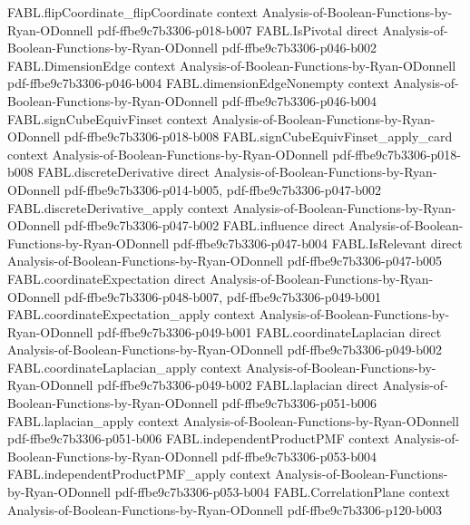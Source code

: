 \begin{theorem}
  {FABL.flipCoordinate_flipCoordinate}
  {context}
  {Analysis-of-Boolean-Functions-by-Ryan-ODonnell}
  {pdf-ffbe9c7b3306-p018-b007}
\proofstep
  {FABL.IsPivotal}
  {direct}
  {Analysis-of-Boolean-Functions-by-Ryan-ODonnell}
  {pdf-ffbe9c7b3306-p046-b002}
\proofstep
  {FABL.DimensionEdge}
  {context}
  {Analysis-of-Boolean-Functions-by-Ryan-ODonnell}
  {pdf-ffbe9c7b3306-p046-b004}
\proofstep
  {FABL.dimensionEdgeNonempty}
  {context}
  {Analysis-of-Boolean-Functions-by-Ryan-ODonnell}
  {pdf-ffbe9c7b3306-p046-b004}
\proofstep
  {FABL.signCubeEquivFinset}
  {context}
  {Analysis-of-Boolean-Functions-by-Ryan-ODonnell}
  {pdf-ffbe9c7b3306-p018-b008}
\proofstep
  {FABL.signCubeEquivFinset_apply_card}
  {context}
  {Analysis-of-Boolean-Functions-by-Ryan-ODonnell}
  {pdf-ffbe9c7b3306-p018-b008}
\proofstep
  {FABL.discreteDerivative}
  {direct}
  {Analysis-of-Boolean-Functions-by-Ryan-ODonnell}
  {pdf-ffbe9c7b3306-p014-b005,
    pdf-ffbe9c7b3306-p047-b002}
\proofstep
  {FABL.discreteDerivative_apply}
  {context}
  {Analysis-of-Boolean-Functions-by-Ryan-ODonnell}
  {pdf-ffbe9c7b3306-p047-b002}
\proofstep
  {FABL.influence}
  {direct}
  {Analysis-of-Boolean-Functions-by-Ryan-ODonnell}
  {pdf-ffbe9c7b3306-p047-b004}
\proofstep
  {FABL.IsRelevant}
  {direct}
  {Analysis-of-Boolean-Functions-by-Ryan-ODonnell}
  {pdf-ffbe9c7b3306-p047-b005}
\proofstep
  {FABL.coordinateExpectation}
  {direct}
  {Analysis-of-Boolean-Functions-by-Ryan-ODonnell}
  {pdf-ffbe9c7b3306-p048-b007,
    pdf-ffbe9c7b3306-p049-b001}
\proofstep
  {FABL.coordinateExpectation_apply}
  {context}
  {Analysis-of-Boolean-Functions-by-Ryan-ODonnell}
  {pdf-ffbe9c7b3306-p049-b001}
\proofstep
  {FABL.coordinateLaplacian}
  {direct}
  {Analysis-of-Boolean-Functions-by-Ryan-ODonnell}
  {pdf-ffbe9c7b3306-p049-b002}
\proofstep
  {FABL.coordinateLaplacian_apply}
  {context}
  {Analysis-of-Boolean-Functions-by-Ryan-ODonnell}
  {pdf-ffbe9c7b3306-p049-b002}
\proofstep
  {FABL.laplacian}
  {direct}
  {Analysis-of-Boolean-Functions-by-Ryan-ODonnell}
  {pdf-ffbe9c7b3306-p051-b006}
\proofstep
  {FABL.laplacian_apply}
  {context}
  {Analysis-of-Boolean-Functions-by-Ryan-ODonnell}
  {pdf-ffbe9c7b3306-p051-b006}
\proofstep
  {FABL.independentProductPMF}
  {context}
  {Analysis-of-Boolean-Functions-by-Ryan-ODonnell}
  {pdf-ffbe9c7b3306-p053-b004}
\proofstep
  {FABL.independentProductPMF_apply}
  {context}
  {Analysis-of-Boolean-Functions-by-Ryan-ODonnell}
  {pdf-ffbe9c7b3306-p053-b004}
\proofstep
  {FABL.CorrelationPlane}
  {context}
  {Analysis-of-Boolean-Functions-by-Ryan-ODonnell}
  {pdf-ffbe9c7b3306-p120-b003}
\proofstep

\end{theorem}
